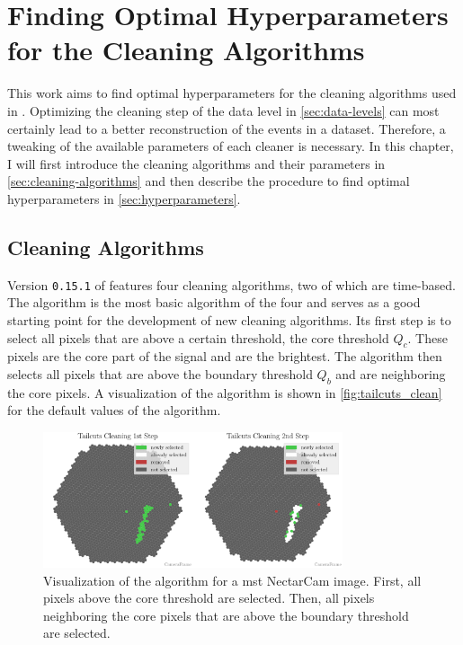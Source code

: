 \chapter{Finding Optimal Hyperparameters for the Cleaning Algorithms}
\label{ch:finding-hyperparams}

This work aims to find optimal hyperparameters for the cleaning algorithms used in \ctapipe{}.
Optimizing the cleaning step of the \dlo{} data level in \autoref{sec:data-levels} can most certainly lead to a better
reconstruction of the events in a dataset. Therefore, a tweaking of the available parameters of each
cleaner is necessary. In this chapter, I will first introduce the cleaning algorithms and their parameters
in \autoref{sec:cleaning-algorithms} and then describe the procedure to find optimal hyperparameters
in \autoref{sec:hyperparameters}.

\section{Cleaning Algorithms}
\label{sec:cleaning-algorithms}

Version \texttt{0.15.1} of \ctapipe{} features four cleaning algorithms, two of which are time-based.
The \tailcuts{} algorithm is the most basic algorithm of the four and serves as a good
starting point for the development of new cleaning algorithms. Its first step is to select all
pixels that are above a certain threshold, the core threshold \(Q_c\). These
pixels are the core part of the signal and are the brightest. The \tailcuts{} algorithm
then selects all pixels that are above the boundary threshold \(Q_b\) and are neighboring
the core pixels. A visualization of the algorithm is shown in \autoref{fig:tailcuts_clean} for the
default values of the algorithm.

\begin{figure}
    \centering
    \includegraphics[height=4cm]{plots/cleaner_steps/tailcuts.pdf}
    \caption{Visualization of the \tailcuts{} algorithm for a \gls{mst} NectarCam image. First, all
    pixels above the core threshold are selected. Then, all pixels neighboring the core
    pixels that are above the boundary threshold are selected.}
    \label{fig:tailcuts_clean}
\end{figure}

